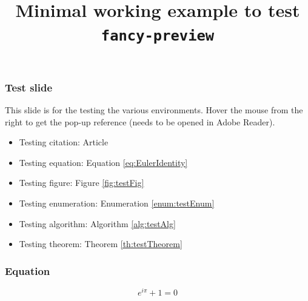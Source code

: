 \documentclass[hyperref={colorlinks=true,citecolor=green,linkcolor=red}]{beamer}
\title{Minimal working example to test \texttt{fancy-preview}}
\date{}
\begin{document}
	
	
	
\begin{frame}
	\titlepage
\end{frame}


\begin{frame}
   \frametitle{Test slide}
   This slide is for the testing the various environments. Hover the mouse from the right to get the pop-up reference (needs to be opened in Adobe Reader).
   \begin{itemize}
      \item Testing citation: Article \cite{Bourdin2008}
      \item Testing equation: Equation \eqref{eq:EulerIdentity}
      \item Testing figure: Figure \ref{fig:testFig}
      \item Testing enumeration: Enumeration \ref{enum:testEnum}
      \item Testing algorithm: Algorithm \ref{alg:testAlg}
      \item Testing theorem: Theorem \ref{th:testTheorem}
   \end{itemize}
\end{frame}


\begin{frame}
   \frametitle{Equation}
   \begin{equation}
      e^{i\pi} + 1 = 0
      \label{eq:EulerIdentity}
   \end{equation}
\end{frame}
\end{document}
